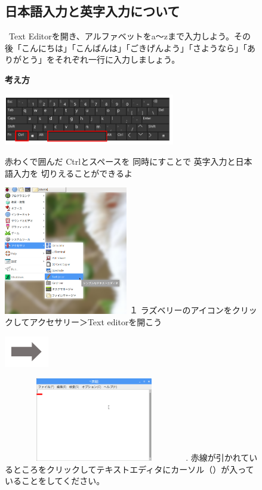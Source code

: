 \documentclass[a4paper,12pt]{jarticle}
\begin{document}
\clearpage
\begin{figure}[ht]
  \subsection{\theExercise 日本語入力と英字入力について}
  \ Text
  Editorを開き、アルファベットをa〜zまで入力しよう。その後「こんにちは」「こんばんは」「ごきげんよう」「さようなら」「ありがとう」をそれぞれ一行に入力しましょう。

  {\bf\large 考え方}


  \centering
  \begin{minipage}{\textwidth}
    \includegraphics[width=7.459cm,height=2.245cm]{textbook-img065.png}
    \raisebox{10mm}
    {
      \begin{minipage}{0.5\textwidth}
        赤わくで囲んだ
        Ctrlとスペースを
        同時にすことで
        英字入力と日本語入力を
        切りえることができるよ
      \end{minipage}
    }
  \end{minipage}

  \begin{minipage}{6.984cm}
    \includegraphics[width=5.408cm,height=5.595cm]{textbook-img064.png}
    \flushleft
    １
    ラズベリーのアイコンをクリックしてアクセサリー＞Text
    editorを開こう
  \end{minipage}
  \includegraphics[width=1.919cm,height=1.365cm]{textbook-img053.png}
  \begin{minipage}{7.347cm}
    \includegraphics[width=7.897cm,height=3.655cm]{textbook-img063.png}
    .
    赤線が引かれているところをクリックしてテキストエディタにカーソル（）が入っていることをしてください。
  \end{minipage}


\end{figure}
\end{document}
